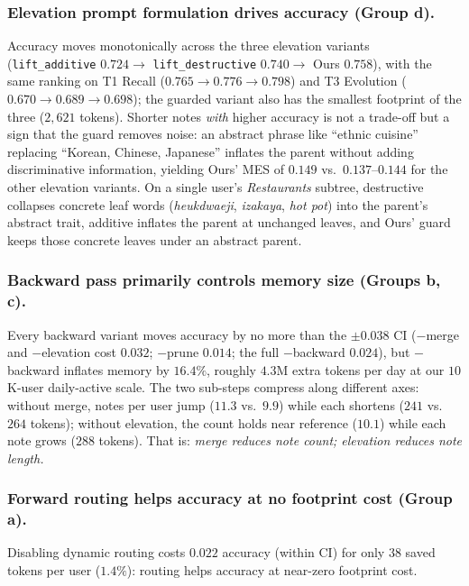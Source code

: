 \documentclass[sigconf,review,anonymous]{acmart}
\begin{document}
\subsubsection{Elevation prompt formulation drives accuracy (Group d).}
Accuracy moves monotonically across the three elevation variants (\texttt{lift\_additive} \(0.724 \to\) \texttt{lift\_destructive} \(0.740 \to\) Ours \(0.758\)), with the same ranking on T1 Recall (\(0.765 \to 0.776 \to 0.798\)) and T3 Evolution (\(0.670 \to 0.689 \to 0.698\)); the guarded variant also has the smallest footprint of the three (\(2{,}621\) tokens). Shorter notes \emph{with} higher accuracy is not a trade-off but a sign that the guard removes noise: an abstract phrase like ``ethnic cuisine'' replacing ``Korean, Chinese, Japanese'' inflates the parent without adding discriminative information, yielding Ours' MES of \(0.149\) vs.\ \(0.137\)--\(0.144\) for the other elevation variants. On a single user's \emph{Restaurants} subtree, destructive collapses concrete leaf words (\emph{heukdwaeji}, \emph{izakaya}, \emph{hot pot}) into the parent's abstract trait, additive inflates the parent at unchanged leaves, and Ours' guard keeps those concrete leaves under an abstract parent.

\subsubsection{Backward pass primarily controls memory size (Groups b, c).}
Every backward variant moves accuracy by no more than the \(\pm 0.038\) CI ($-$merge and $-$elevation cost \(0.032\); $-$prune \(0.014\); the full $-$backward \(0.024\)), but $-$backward inflates memory by \(16.4\%\), roughly \(4.3\)M extra tokens per day at our \(10\)K-user daily-active scale. The two sub-steps compress along different axes: without merge, notes per user jump (\(11.3\) vs.\ \(9.9\)) while each shortens (\(241\) vs.\ \(264\) tokens); without elevation, the count holds near reference (\(10.1\)) while each note grows (\(288\) tokens). That is: \emph{merge reduces note count; elevation reduces note length.}

\subsubsection{Forward routing helps accuracy at no footprint cost (Group a).}
Disabling dynamic routing costs \(0.022\) accuracy (within CI) for only \(38\) saved tokens per user (\(1.4\%\)): routing helps accuracy at near-zero footprint cost.
\end{document}
